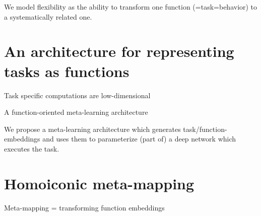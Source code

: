 \documentclass{beamer}
\begin{document}
\begin{frame}[standout]
We model flexibility as the ability to transform one function (=task=behavior) to a systematically related one.
\end{frame}

\section{An architecture for representing tasks as functions}

\begin{frame}{Task specific computations are low-dimensional}

\end{frame}

\begin{frame}{A function-oriented meta-learning architecture}

\end{frame}

\begin{frame}[standout]
We propose a meta-learning architecture which generates task/function-embeddings and uses them to parameterize (part of) a deep network which executes the task. %
\end{frame}

\section{Homoiconic meta-mapping}

\begin{frame}{Meta-mapping = transforming function embeddings}

\end{frame}
\end{document}

